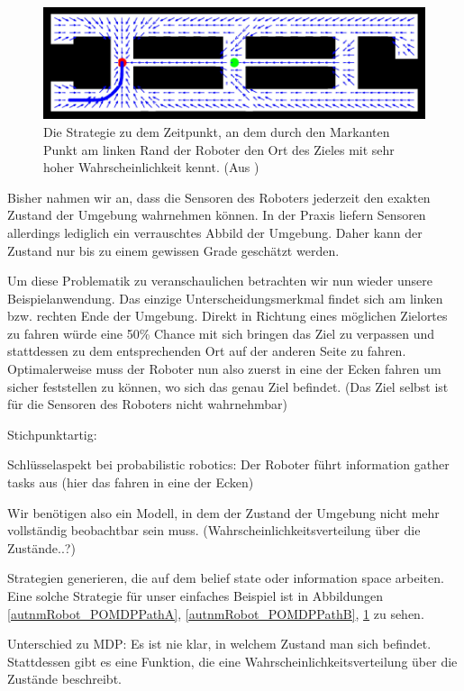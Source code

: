 \documentclass[a4paper]{IEEEtran}
\begin{document}
\begin{figure}[ht]
	\centering
	\includegraphics[scale=0.72]{images/autnmRobot_POMDPPathC.png}
	\caption{Die Strategie zu dem Zeitpunkt, an dem durch den Markanten Punkt am linken Rand der Roboter den Ort des Zieles mit sehr hoher Wahrscheinlichkeit kennt. (Aus \cite{thrun2005probabilistic})}
	\label{autnmRobot_POMDPPathC}
\end{figure}

Bisher nahmen wir an, dass die Sensoren des Roboters jederzeit den exakten Zustand der Umgebung wahrnehmen können. In der Praxis liefern Sensoren allerdings lediglich ein verrauschtes Abbild der Umgebung. Daher kann der Zustand nur bis zu einem gewissen Grade geschätzt werden.

Um diese Problematik zu veranschaulichen betrachten wir nun wieder unsere Beispielanwendung. Das einzige Unterscheidungsmerkmal findet sich am linken bzw. rechten Ende der Umgebung. Direkt in Richtung eines möglichen Zielortes zu fahren würde eine 50\% Chance mit sich bringen das Ziel zu verpassen und stattdessen zu dem entsprechenden Ort auf der anderen Seite zu fahren. Optimalerweise muss der Roboter nun also zuerst in eine der Ecken fahren um sicher feststellen zu können, wo sich das genau Ziel befindet. (Das Ziel selbst ist für die Sensoren des Roboters nicht wahrnehmbar)

Stichpunktartig: %

Schlüsselaspekt bei probabilistic robotics: Der Roboter führt information gather tasks aus (hier das fahren in eine der Ecken)

Wir benötigen also ein Modell, in dem der Zustand der Umgebung nicht mehr vollständig beobachtbar sein muss. (Wahrscheinlichkeitsverteilung über die Zustände..?)

Strategien generieren, die auf dem belief state oder information space arbeiten. Eine solche Strategie für unser einfaches Beispiel ist in Abbildungen \ref{autnmRobot_POMDPPathA}, \ref{autnmRobot_POMDPPathB}, \ref{autnmRobot_POMDPPathC} zu sehen.

Unterschied zu MDP: Es ist nie klar, in welchem Zustand man sich befindet. Stattdessen gibt es eine Funktion, die eine Wahrscheinlichkeitsverteilung über die Zustände beschreibt.
\end{document}
